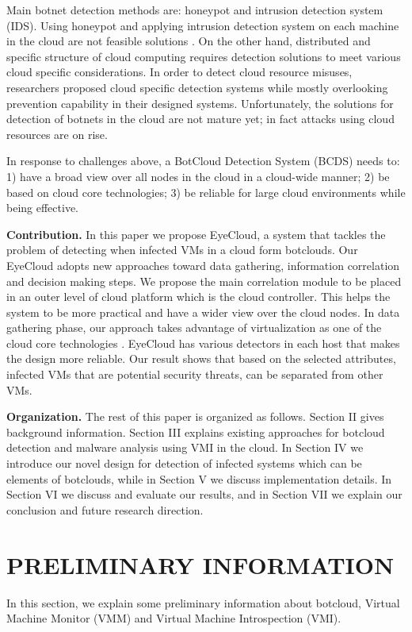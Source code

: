 \documentclass[conference]{IEEEtran}
\begin{document}
Main botnet detection methods are: honeypot and intrusion detection system (IDS). Using honeypot and applying intrusion detection system on each machine in the cloud are not feasible solutions \cite{ref42} \cite{ref38}. On the other hand, distributed and specific structure of cloud computing requires detection solutions to meet various cloud specific considerations. In order to detect cloud resource misuses, researchers proposed cloud specific detection systems while mostly overlooking prevention capability in their designed systems. Unfortunately, the solutions for detection of botnets in the cloud are not mature yet; in fact attacks using cloud resources are on rise.

In response to challenges above, a BotCloud Detection System (BCDS) needs to: 1) have a broad view over all nodes in the cloud in a cloud-wide manner; 2) be based on cloud core technologies; 3) be reliable for large cloud environments while being effective. 

\textbf{Contribution.}
In this paper we propose EyeCloud, a system that tackles the problem of detecting when infected VMs in a cloud form botclouds. Our EyeCloud adopts new approaches toward data gathering, information correlation and decision making steps. We propose the main correlation module to be placed in an outer level of cloud platform which is the cloud controller. This helps the system to be more practical and have a wider view over the cloud nodes. In data gathering phase, our approach takes advantage of virtualization as one of the cloud core technologies \cite{ref9}. EyeCloud has various detectors in each host that makes the design more reliable. Our result shows that based on the selected attributes, infected VMs that are potential security threats, can be separated from other VMs. 

\textbf{Organization.}
The rest of this paper is organized as follows. Section II gives background information. Section III explains existing approaches for botcloud detection and malware analysis using VMI in the cloud. In Section IV we introduce our novel design for detection of infected systems which can be elements of botclouds, while in Section V we discuss implementation details. In Section VI we discuss and evaluate our results, and in Section VII we explain our conclusion and future research direction.
\section{PRELIMINARY INFORMATION }
In this section, we explain some preliminary information about botcloud, Virtual Machine Monitor (VMM) and Virtual Machine Introspection (VMI).
 
\end{document}
